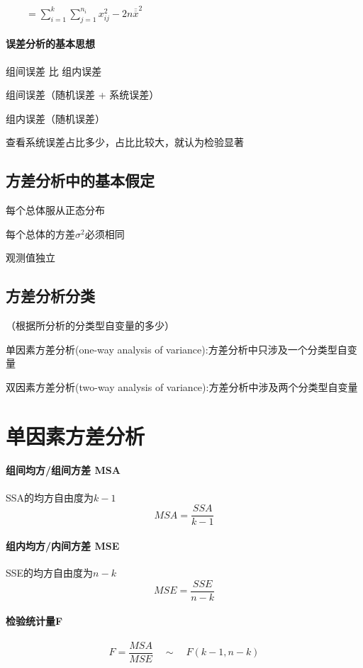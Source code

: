 \documentclass[UTF8,10pt]{book}
\begin{document}
{    $ \quad \quad = \sum_{i=1}^k \sum_{j=1}^{n_i} x_{ij}^2 - 2n\overline{\overline{x}}^2$

    \paragraph{误差分析的基本思想}	组间误差 比 组内误差 
    
    组间误差（随机误差 + 系统误差）
    
    组内误差（随机误差） 
    
    查看系统误差占比多少，占比比较大，就认为检验显著

\subsection{方差分析中的基本假定}	
每个总体服从正态分布

每个总体的方差$\sigma^2$必须相同

观测值独立

\subsection{方差分析分类}
 （根据所分析的分类型自变量的多少）	
 
 单因素方差分析(one-way analysis of variance):方差分析中只涉及一个分类型自变量 
 
 双因素方差分析(two-way analysis of variance):方差分析中涉及两个分类型自变量

\section{单因素方差分析}

\paragraph{组间均方/组间方差 MSA}
    SSA的均方自由度为$k-1$ 
    $$ MSA = \frac{SSA}{k-1} $$

\paragraph{组内均方/内间方差 MSE}	
    SSE的均方自由度为$n-k$ 
    $$ MSE = \frac{SSE}{n-k} $$

\paragraph{检验统计量F}	
$$ F = \frac{MSA}{MSE} \quad \sim \quad F(k-1,n-k) $$

}
\end{document}
